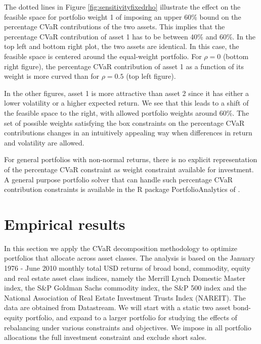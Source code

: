 \documentclass[12pt,a4paper]{article}
\begin{document}
The dotted lines in Figure \ref{fig:sensitivityfixedrho} illustrate the effect on the feasible space for portfolio weight 1 of imposing an upper 60\% bound on the percentage CVaR contributions of the two assets. This implies that the percentage CVaR contribution of asset 1 has to be between 40\% and 60\%.
In the top left and bottom right plot, the two assets are identical. In this case, the feasible space is centered around the equal-weight portfolio. For $\rho=0$ (bottom right figure), the percentage CVaR contribution of asset 1 as a function of its weight is more curved than for $\rho=0.5$ (top left figure).

In the other figures, asset 1 is more attractive than asset 2 since it has either a lower volatility or a higher expected return. We see that this leads to a shift of the feasible space to the right, with allowed portfolio weights around 60\%. The set of possible weights satisfying the box constraints on the percentage CVaR contributions changes in an intuitively appealing way when differences in return and volatility are allowed.

For general portfolios with non-normal returns, there is no explicit representation of the percentage CVaR constraint as weight constraint available for investment. A general purpose portfolio solver that can handle such percentage CVaR contribution constraints is available in the R package PortfolioAnalytics of \citet{PortfolioAnalytics}.

\section{Empirical results \label{sec:empiricalresults}}


In this section we apply the CVaR decomposition methodology to optimize portfolios that allocate across asset classes. The analysis is based on the January 1976 - June 2010 monthly total USD returns of broad bond, commodity, equity and real estate asset class indices, namely the Merrill Lynch Domestic Master index,  the S\&P Goldman Sachs commodity index, the S\&P 500 index and the National Association of Real Estate Investment Trusts Index (NAREIT). The data are obtained from Datastream.  We will start with a static two asset bond-equity portfolio, and expand to a larger portfolio for studying the effects of rebalancing under various constraints and objectives. We impose in all portfolio allocations the full investment constraint and exclude short sales.
\end{document}
